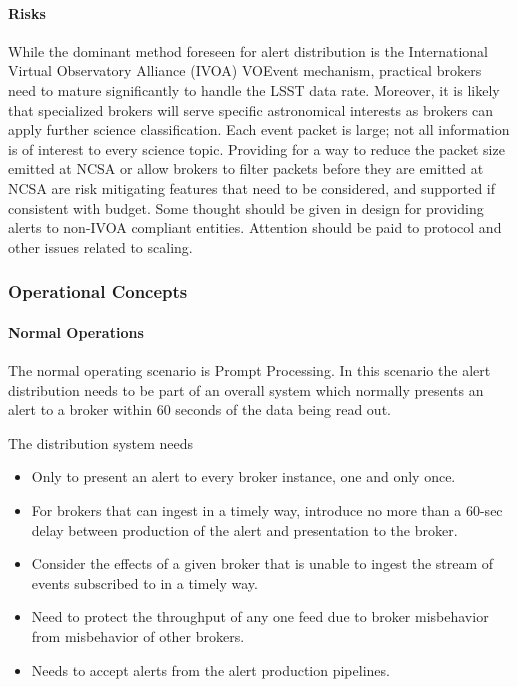 \paragraph{Risks}
While the dominant method foreseen for alert distribution is the International Virtual Observatory Alliance (IVOA) VOEvent mechanism, practical brokers need to mature significantly to handle the LSST data rate. Moreover, it is likely that specialized brokers will serve specific astronomical interests as brokers can apply further science classification. Each event packet is large; not all information is of interest to every science topic. Providing for a way to reduce the packet size emitted at NCSA or allow brokers to filter packets before they are emitted at NCSA are risk mitigating features that need to be considered, and supported if consistent with budget. Some thought should be given in design for providing alerts to non-IVOA compliant entities. Attention should be paid to protocol and other issues related to scaling.

\subsubsection{Operational Concepts}

\paragraph{Normal Operations}
The normal operating scenario is Prompt Processing. In this scenario the alert distribution needs to be part of an overall system which normally presents an alert to a broker within 60 seconds of the data being read out.

The distribution system needs

\begin{itemize}

\item Only to present an alert to every broker instance, one and only once.

\item For brokers that can ingest in a timely way, introduce no more than a 60-sec delay between production of the alert and presentation to the broker.

\item Consider the effects of a given broker that is unable to ingest the stream of events subscribed to in a timely way.

\item Need to protect the throughput of any one feed due to broker misbehavior from misbehavior of other brokers.

\item Needs to accept alerts from the alert production pipelines.

\end{itemize}

